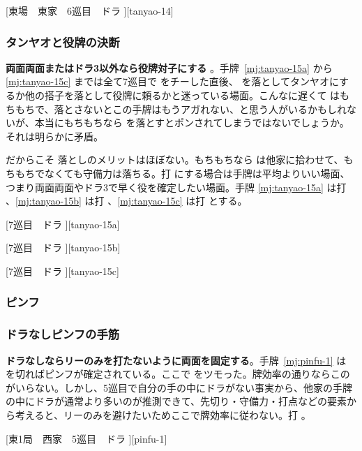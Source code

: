 \documentclass[../nankiru_main.tex]{subfiles}
\begin{document}
[東場　東家　6巡目　ドラ ][tanyao-14]


\subsubsection*{タンヤオと役牌の決断}

\textbf{両面両面またはドラ3以外なら役牌対子にする} \citep[][pp.~177--180]{kawamura-naki}。手牌~\ref{mj:tanyao-15a} から \ref{mj:tanyao-15c} までは全て7巡目で  をチーした直後、 を落としてタンヤオにするか他の搭子を落として役牌に頼るかと迷っている場面。こんなに遅くて  はもちもちで、落とさないとこの手牌はもうアガれない、と思う人がいるかもしれないが、本当にもちもちなら  を落とすとポンされてしまうではないでしょうか。それは明らかに矛盾。

だからこそ  落としのメリットはほぼない。もちもちなら  は他家に拾わせて、もちもちでなくても守備力は落ちる。打  にする場合は手牌は平均よりいい場面、つまり両面両面やドラ3で早く役を確定したい場面。手牌 \ref{mj:tanyao-15a} は打 、\ref{mj:tanyao-15b} は打 、\ref{mj:tanyao-15c} は打  とする。

[7巡目　ドラ ][tanyao-15a]

[7巡目　ドラ ][tanyao-15b]

[7巡目　ドラ ][tanyao-15c]


\subsubsection{ピンフ}

\subsubsection*{ドラなしピンフの手筋}

\textbf{ドラなしならリーのみを打たないように両面を固定する}\citep[][pp.~200--201]{doi-prob}。手牌~\ref{mj:pinfu-1} は を切ればピンフが確定されている。ここで  をツモった。牌効率の通りならこの  がいらない。しかし、5巡目で自分の手の中にドラがない事実から、他家の手牌の中にドラが通常より多いのが推測できて、先切り・守備力・打点などの要素から考えると、リーのみを避けたいためここで牌効率に従わない。打 。

[東1局　西家　5巡目　ドラ ][pinfu-1]
\end{document}
